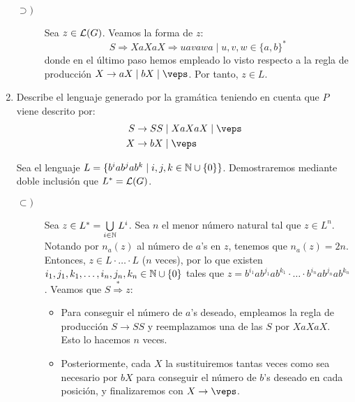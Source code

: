 \begin{ejercicio}
\begin{enumerate}
\begin{description}
            \item[$\supset)$] Sea $z\in\mathcal{L}(G)$. Veamos la forma de $z$:
            \begin{equation*}
                S \Longrightarrow XaXaX \Longrightarrow uavawa \mid u,v,w\in\{a,b\}^\ast
            \end{equation*}
            donde en el último paso hemos empleado lo visto respecto a la regla de producción $X\rightarrow aX \mid bX \mid \veps$. Por tanto, $z\in L$.
        \end{description}

        \item Describe el lenguaje generado por la gramática teniendo en cuenta que $P$ viene descrito por:
        \begin{align*}
            S &\rightarrow SS \mid XaXaX \mid \veps \\
            X &\rightarrow bX \mid \veps
        \end{align*}

        Sea el lenguaje $L=\{b^i a b^j a b^k \mid i,j,k\in \mathbb{N}\cup \{0\}\}$. Demostraremos mediante doble inclusión que $L^\ast=\mathcal{L}(G)$.
        \begin{description}
            \item[$\subset)$] Sea $z\in L^\ast=\bigcup\limits_{i\in \mathbb{N}} L^i$.
            Sea $n$ el menor número natural tal que $z\in L^n$.
            Notando por $n_a(z)$ al número de $a$'s en $z$, tenemos que $n_a(z)=2n$.
            Entonces, $z\in L\cdot \ldots \cdot L$ ($n$ veces), por lo que existen
            $i_1,j_1,k_1,\ldots,i_n,j_n,k_n\in \mathbb{N}\cup \{0\}$ tales que $z=b^{i_1} a b^{j_1} a b^{k_1} \cdot \ldots \cdot b^{i_n} a b^{j_n} a b^{k_n}$. Veamos que
            $S \stackrel{\ast}{\Longrightarrow} z$:
            \begin{itemize}
                \item Para conseguir el número de $a$'s deseado, empleamos la regla de producción $S \rightarrow SS$ y reemplazamos una de las $S$ por $XaXaX$. Esto lo hacemos $n$ veces.
                \item Posteriormente, cada $X$ la sustituiremos tantas veces como sea necesario por $bX$ para conseguir el número de $b$'s deseado en cada posición, y finalizaremos con $X\rightarrow \veps$.
            \end{itemize}


\end{description}
\end{enumerate}
\end{ejercicio}
